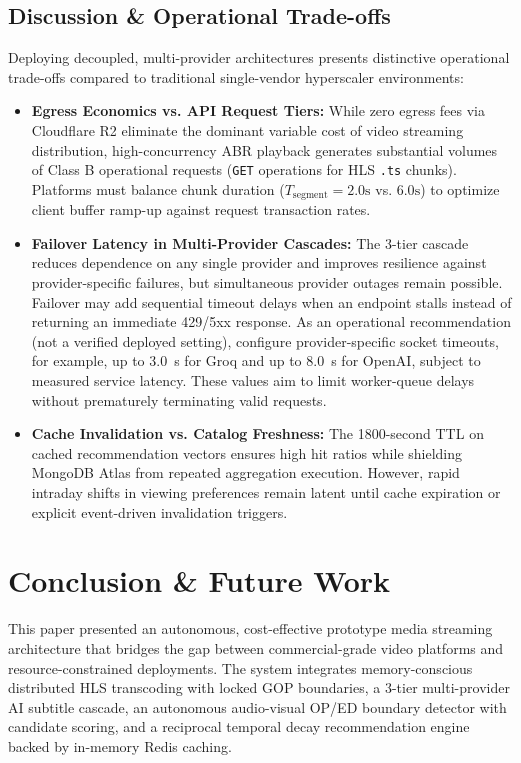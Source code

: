 \documentclass[conference]{IEEEtran}
\begin{document}
\subsection{Discussion \& Operational Trade-offs}
Deploying decoupled, multi-provider architectures presents distinctive operational trade-offs compared to traditional single-vendor hyperscaler environments:
\begin{itemize}
    \item \textbf{Egress Economics vs. API Request Tiers:} While zero egress fees via Cloudflare R2 eliminate the dominant variable cost of video streaming distribution, high-concurrency ABR playback generates substantial volumes of Class B operational requests (\texttt{GET} operations for HLS \texttt{.ts} chunks). Platforms must balance chunk duration ($T_{\text{segment}} = 2.0\text{s}$ vs. $6.0\text{s}$) to optimize client buffer ramp-up against request transaction rates.
    \item \textbf{Failover Latency in Multi-Provider Cascades:} The 3-tier cascade reduces dependence on any single provider and improves resilience against provider-specific failures, but simultaneous provider outages remain possible. Failover may add sequential timeout delays when an endpoint stalls instead of returning an immediate 429/5xx response. As an operational recommendation (not a verified deployed setting), configure provider-specific socket timeouts, for example, up to 3.0~s for Groq and up to 8.0~s for OpenAI, subject to measured service latency. These values aim to limit worker-queue delays without prematurely terminating valid requests.
    \item \textbf{Cache Invalidation vs. Catalog Freshness:} The 1800-second TTL on cached recommendation vectors ensures high hit ratios while shielding MongoDB Atlas from repeated aggregation execution. However, rapid intraday shifts in viewing preferences remain latent until cache expiration or explicit event-driven invalidation triggers.
\end{itemize}

\section{Conclusion \& Future Work}
This paper presented an autonomous, cost-effective prototype media streaming architecture that bridges the gap between commercial-grade video platforms and resource-constrained deployments. The system integrates memory-conscious distributed HLS transcoding with locked GOP boundaries, a 3-tier multi-provider AI subtitle cascade, an autonomous audio-visual OP/ED boundary detector with candidate scoring, and a reciprocal temporal decay recommendation engine backed by in-memory Redis caching.
\end{document}
